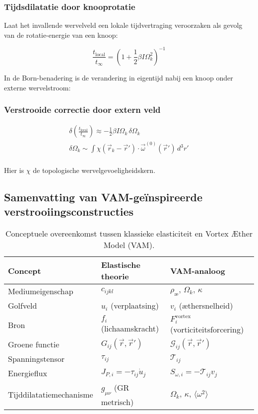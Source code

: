 \subsubsection*{Tijdsdilatatie door knooprotatie}

Laat het invallende wervelveld een lokale tijdvertraging veroorzaken als gevolg van de rotatie-energie van een knoop:

\[
\frac{t_{\text{local}}}{t_{\infty}} = \left(1 + \frac{1}{2} \beta I \Omega_k^2 \right)^{-1}
\]

In de Born-benadering is de verandering in eigentijd nabij een knoop onder externe wervelstroom:

\subsubsection*{Verstrooide correctie door extern veld}

\begin{gather*}
\delta \left( \frac{t_{\text{local}}}{t_{\infty}} \right) \approx - \frac{1}{2} \beta I \Omega_k \, \delta \Omega_k\\
\delta \Omega_k \sim \int \chi(\vec{r}_k - \vec{r}') \cdot \vec{\omega}^{(0)}(\vec{r}') \, d^3r'\\
\end{gather*}

Hier is \(\chi\) de topologische wervelgevoeligheidskern.

\subsection{Samenvatting van VAM-geïnspireerde verstrooiingsconstructies}

\begin{table}[htbp]
\centering
\begin{tabular}{lll}
\toprule
\textbf{Concept} & \textbf{Elastische theorie} & \textbf{VAM-analoog} \\
\midrule
Mediumeigenschap & \( c_{ijkl} \) & \( \rho_{\text{\ae}},\, \Omega_k,\, \kappa \) \\
Golfveld & \( u_i \) (verplaatsing) & \( v_i \) (æthersnelheid) \\
Bron & \( f_i \) (lichaamskracht) & \( F_i^{\text{vortex}} \) (vorticiteitsforcering) \\
Groene functie & \( G_{ij}(\vec{r}, \vec{r}') \) & \( \mathcal{G}_{ij}(\vec{r}, \vec{r}') \) \\
Spanningstensor & \( \tau_{ij} \) & \( \mathcal{T}_{ij} \) \\
Energieflux & \( J_{P,i} = -\tau_{ij} \dot{u}_j \) & \( S_{\omega,i} = -\mathcal{T}_{ij} v_j \) \\
Tijddilatatiemechanisme & \( g_{\mu\nu} \) (GR metrisch) & \( \Omega_k,\, \kappa,\, \langle \omega^2 \rangle \) \\
\bottomrule
\end{tabular}
\caption{Conceptuele overeenkomst tussen klassieke elasticiteit en Vortex Æther Model (VAM).}
\label{tab:elastic-vam-analogy}
\end{table}

